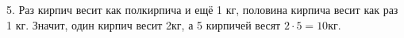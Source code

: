 5. Раз кирпич весит как полкирпича и ещё 1 кг, половина кирпича весит как раз 1 кг. Значит, один кирпич весит 2кг, а 5 кирпичей весят $2\cdot5=10$кг.\\
